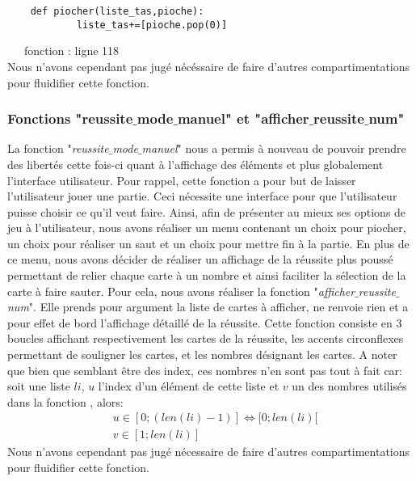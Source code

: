 \documentclass[10pt,a4paper,french,titlepage]{article}
\theoremstyle{definition}
\begin{document}
\begin{lstlisting}
	def piocher(liste_tas,pioche):
    		liste_tas+=[pioche.pop(0)]

\end{lstlisting}

~~~fonction : ligne 118\\

Nous n'avons cependant pas jugé nécéssaire de faire d'autres compartimentations pour fluidifier cette fonction.

\subsubsection{Fonctions "reussite$\_$mode$\_$manuel" et "afficher$\_$reussite$\_$num"}
La fonction "\textit{reussite$\_$mode$\_$manuel}" nous a permis à nouveau de pouvoir prendre des libertés cette fois-ci quant à l'affichage des éléments et plus globalement l'interface utilisateur. Pour rappel, cette fonction a pour but de laisser l'utilisateur jouer une partie. Ceci nécessite une interface pour que l'utilisateur puisse choisir ce qu'il veut faire. Ainsi, afin de présenter au mieux ses options de jeu à l'utilisateur, nous avons réaliser un menu contenant un choix pour piocher, un choix pour réaliser un saut et un choix pour mettre fin à la partie. En plus de ce menu, nous avons décider de réaliser un affichage de la réussite plus poussé permettant de relier chaque carte à un nombre et ainsi faciliter la sélection de la carte à faire sauter. 
Pour cela, nous avons réaliser la fonction "\textit{afficher$\_$reussite$\_$num}". Elle prends pour argument la liste de cartes à afficher, ne renvoie rien et a pour effet de bord l'affichage détaillé de la réussite. Cette fonction consiste en 3 boucles affichant respectivement les cartes de la réussite, les
accents circonflexes permettant de souligner les cartes, et les nombres désignant les cartes. A noter que bien que semblant être des index, ces nombres n'en sont pas tout à fait car: soit une liste $li$, $u$ l'index d'un élément de cette liste et $v$ un des nombres utilisés dans la fonction , alors:
\begin{align*}
	&u \in [0;(len(li)-1)] \iff [0;len(li)[\\
	&v \in [1;len(li)]
\end{align*}
Nous n'avons cependant pas jugé nécessaire de faire d'autres compartimentations pour fluidifier cette fonction.\\
\end{document}
